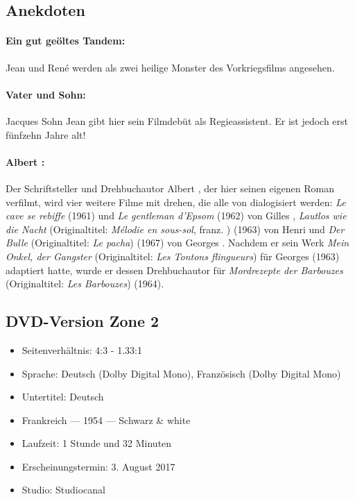 \subsection*{Anekdoten} 

\paragraph{Ein gut geöltes Tandem:} Jean  und René  werden als zwei heilige Monster des Vorkriegsfilms angesehen.
\paragraph{ Vater und Sohn:} Jacques  Sohn Jean gibt hier sein Filmdebüt als Regieassistent. Er ist jedoch erst fünfzehn Jahre alt!
\paragraph{Albert :} Der Schriftsteller und Drehbuchautor Albert , der hier seinen eigenen Roman verfilmt, wird vier weitere Filme mit  drehen, die alle von  dialogisiert werden: \emph{Le cave se rebiffe} (1961) und \emph{Le gentleman d'Epsom} (1962) von Gilles , \emph{Lautlos wie die Nacht} (Originaltitel: \emph{Mélodie en sous-sol}, franz. ) (1963) von Henri  und \emph{Der Bulle} (Originaltitel: \emph{Le pacha}) (1967) von Georges . Nachdem er sein Werk \emph{Mein Onkel, der Gangster} (Originaltitel: \emph{Les Tontons flingueurs}) für Georges  (1963) adaptiert hatte, wurde er dessen Drehbuchautor für \emph{Mordrezepte der Barbouzes} (Originaltitel: \emph{Les Barbouzes}) (1964).

\subsection*{DVD-Version Zone 2}

\begin{itemize}\itemsep=-3pt
    \item Seitenverhältnis: 4:3 - 1.33:1
    \item Sprache: Deutsch (Dolby Digital Mono), Französisch (Dolby Digital Mono)
    \item Untertitel: Deutsch
    \item Frankreich --- 1954 --- Schwarz \& white
    \item Laufzeit: 1 Stunde und 32 Minuten
    \item Erscheinungstermin: 3. August 2017
    \item Studio: Studiocanal
\end{itemize}

